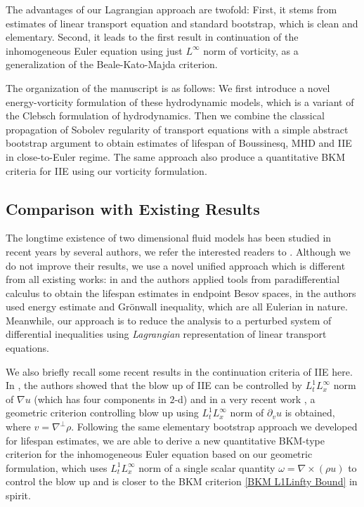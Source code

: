 \documentclass[12pt,letterpaper]{article}
\theoremstyle{plain}
\begin{document}
The advantages of our Lagrangian approach are twofold: First, it stems from estimates of linear transport equation and standard bootstrap, which is clean and elementary. Second, it leads to the first result in continuation of the inhomogeneous Euler equation using just $L^\infty$ norm of vorticity, as a generalization of the Beale-Kato-Majda criterion.

The organization of the manuscript is as follows: We first introduce a novel energy-vorticity formulation of these hydrodynamic models, which is a variant of the Clebsch formulation of hydrodynamics. Then we combine the classical propagation of Sobolev regularity of transport equations with a simple abstract bootstrap argument to obtain estimates of lifespan of Boussinesq, MHD and IIE in close-to-Euler regime. The same approach also produce a quantitative BKM criteria for IIE using our vorticity formulation.

\subsection{Comparison with Existing Results}

 The longtime existence of two dimensional fluid models has been studied in recent years by several authors, we refer the interested readers to \cite{BaeLopesFilhoMazzucatoNussenzveigLopes2025}\cite{CobbFanelli2023}\cite{[DF11]}. Although we do not improve their results, we use a novel unified approach which is different from all existing works: in \cite{CobbFanelli2023} and \cite{[DF11]} the authors applied tools from paradifferential calculus to obtain the lifespan estimates in endpoint Besov spaces, in \cite{BaeLopesFilhoMazzucatoNussenzveigLopes2025} the authors used energy estimate and Gr\"onwall inequality, which are all Eulerian in nature. Meanwhile, our approach is to reduce the analysis to a perturbed system of differential inequalities using \textit{Lagrangian} representation of linear transport equations.

We also briefly recall some recent results in the continuation criteria of IIE here. In \cite{BaeLeeShin2020}, the authors showed that the blow up of IIE can be controlled by $L_t^1L_x^\infty$ norm of $\nabla u$ (which has four components in $2$-d) and in a very recent work \cite{Fanelli2026GeometricIIE}, a geometric criterion controlling blow up using $L_t^1L_x^\infty$ norm of $\partial_vu$ is obtained, where $v=\nabla^\perp\rho$.  Following the same elementary bootstrap approach we developed for lifespan estimates, we are able to derive a new quantitative BKM-type criterion for the inhomogeneous Euler equation based on our geometric formulation, which uses $L_t^1L_x^\infty$ norm of a single scalar quantity $\omega=\nabla\times (\rho u)$ to control the blow up and is closer to the BKM criterion \eqref{BKM L1Linfty Bound} in spirit. 
\end{document}
